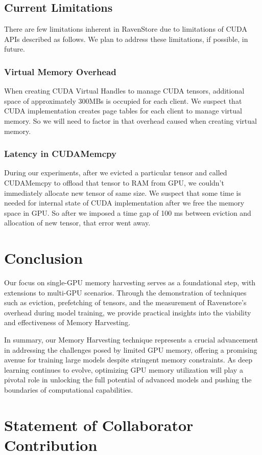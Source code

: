 \documentclass{article}
\begin{document}
\subsection{Current Limitations}
There are few limitations inherent in RavenStore due to limitations of CUDA APIs described as follows.
We plan to address these limitations, if possible, in future.
\subsubsection{Virtual Memory Overhead}
When creating CUDA Virtual Handles to manage CUDA tensors, additional space of approximately 300MBs is occupied 
for each client. We suspect that CUDA implementation creates page tables for each client to manage virtual memory.
So we will need to factor in that overhead caused when creating virtual memory.
\subsubsection{Latency in CUDAMemcpy}
During our experiments, after we evicted a particular tensor and called CUDAMemcpy to offload that tensor to RAM from GPU,
we couldn't immediately allocate new tensor of same size. We suspect that some time is needed for internal state of CUDA implementation
after we free the memory space in GPU. So after we imposed a time gap of 100 ms between eviction and allocation of new tensor, that error
went away.


\section{Conclusion}
Our focus on single-GPU memory harvesting serves as a foundational step, with extensions to multi-GPU scenarios. Through the demonstration of 
techniques such as eviction, prefetching of tensors, and the measurement of Ravenstore's overhead during model training, we provide practical insights into the viability and effectiveness of Memory Harvesting.

In summary, our Memory Harvesting technique represents a crucial advancement in addressing the challenges posed by limited GPU memory, offering a promising avenue 
for training large models despite stringent memory constraints. As deep learning continues to evolve, optimizing GPU memory utilization will play a pivotal role 
in unlocking the full potential of advanced models and pushing the boundaries of computational capabilities.

\section{Statement of Collaborator Contribution}
\end{document}
